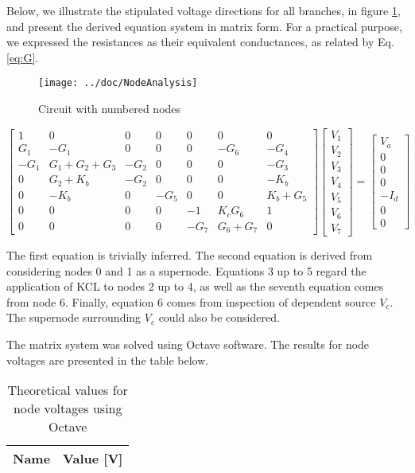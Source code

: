 Below, we illustrate the stipulated voltage directions for all branches, in figure \ref{fig:fignode}, and present the derived equation system in matrix form. For a practical purpose, we expressed the resistances as their equivalent conductances, as related by Eq.\ref{eq:G}.


\begin{figure}[H]
  \centering
  \texttt{[image: ../doc/NodeAnalysis]}
  \caption{Circuit with numbered nodes}
  \label{fig:fignode}
\end{figure}


\begin{equation*}
\begin{bmatrix}
 1 & 0 & 0 & 0 & 0 & 0 & 0 \\
 G_1 & -G_1 & 0 & 0 & 0 & -G_6 & -G_4 \\
 -G_1 & G_1+G_2+G_3 & -G_2 & 0 & 0 & 0 & -G_3\\
 0 & G_2+K_b & -G_2 & 0 & 0 & 0 & -K_b\\
 0 & -K_b & 0 & -G_5 & 0 & 0 & K_b+G_5\\
 0 & 0 & 0 & 0 & -1 & K_cG_6 & 1\\
 0 & 0 & 0 & 0 & -G_7 & G_6+G_7 & 0\end{bmatrix}
\begin{bmatrix}
 V_1\\ V_2\\ V_3\\ V_4\\ V_5\\ V_6\\ V_7\end{bmatrix}
=
\begin{bmatrix}
 V_a\\ 0\\ 0\\ 0\\ -I_d\\ 0\\ 0 \end{bmatrix}
\end{equation*}

\par The first equation is trivially inferred. The second equation is derived from considering nodes 0 and 1 as a supernode. Equations 3 up to 5 regard the application of KCL to nodes 2 up to 4, as well as the seventh equation comes from node 6. Finally, equation 6 comes from inspection of dependent source $V_c$. The supernode surrounding $V_c$ could also be considered.

\par The matrix system was solved using Octave software. The results for node voltages are presented in the table below.


\begin{table}[H]
  \centering
  \begin{tabular}{|l|r|}
    \hline
    {\bf Name} & {\bf Value [V]} \\ \hline
    
  \end{tabular}
  \caption{Theoretical values for node voltages using Octave}
  \label{tab:TVoltages}
\end{table}
